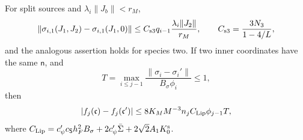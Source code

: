 \documentclass[11pt,letterpaper,reqno]{amsart}
\makeatletter
\theoremstyle{definition}
\newcommand{\ms@minorstart}{%
  \pushQED{\qed}\renewcommand{\qedsymbol}{$\blacksquare$}}
\newenvironment{lemma}[1][]{\ms@minorstart\ms@lemma[#1]}
  {\popQED\endms@lemma}
\theoremstyle{remark}
\makeatother
\begin{document}
\begin{lemma}\label{C-415-11}
For split sources and $\lambda_i\|J_b\|<r_M$,
\begin{equation}\label{eq:qcdm2-chain-feedback}
 \|\sigma_{i,1}(J_1,J_2)-\sigma_{i,1}(J_1,0)\|
 \le C_{\rm s3}q_{i-1}\frac{\lambda_i\|J_2\|}{r_M},
 \qquad C_{\rm s3}=\frac{3N_3}{1-4/L},
\end{equation}
and the analogous assertion holds for species two.
If two inner coordinates have the same $\mathsf n$, and
\[
 T=\max_{i\le j-1}
       \frac{\|\sigma_i-\sigma_i'\|}{B_\sigma\phi_i}\le1,
\]
then
\begin{equation}\label{eq:qcdm2-scalar-Lipschitz}
 |f_j(\mathfrak c)-f_j(\mathfrak c')|
 \le8K_MM^{-3}n_jC_{\rm Lip}\phi_{j-1}T,
\end{equation}
where
$C_{\rm Lip}=c'_\psi c_{\mathsf S}h_F^2B_\sigma
 +2c'_\psi\bar\Sigma+2\sqrt2A_1K_0^{\rm s}$.
\end{lemma}
\end{document}
